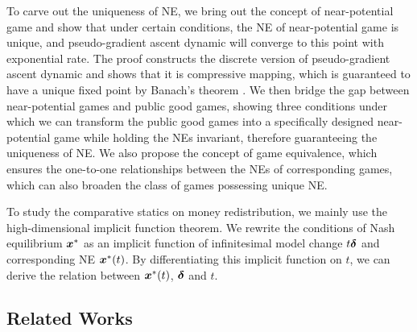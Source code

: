 To carve out the uniqueness of NE, we bring out the concept of near-potential game and show that under certain conditions, the NE of near-potential game is unique, and pseudo-gradient ascent dynamic will converge to this point with exponential rate. The proof constructs the discrete version of pseudo-gradient ascent dynamic and shows that it is compressive mapping, which is guaranteed to have a unique fixed point by Banach's theorem \citep{banach:banach1922operations}.
We then bridge the gap between near-potential games and public good games, showing three conditions under which we can transform the public good games into a specifically designed near-potential game while holding the NEs invariant, therefore guaranteeing the uniqueness of NE. 
We also propose the concept of game equivalence, which ensures the one-to-one relationships between the NEs of corresponding games, which can also broaden the class of games possessing unique NE.

To study the comparative statics on money redistribution, we mainly use the high-dimensional implicit function theorem.
We rewrite the conditions of Nash equilibrium ${\bm{x}}^*$ as an implicit function of infinitesimal model change $t\bm{\delta}$ and corresponding NE ${\bm{x}}^*(t)$.
By differentiating this implicit function on $t$, we can derive the relation between ${\bm{x}}^*(t)$, $\bm{\delta}$ and $t$.

\subsection{Related Works}

